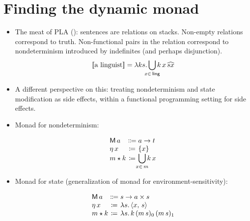\section{Finding the dynamic monad}
\begin{itemize}
	\item The meat of PLA (\citealt{Dekker:1994}): sentences are relations on stacks. Non-empty relations correspond to truth. Non-functional pairs in the relation correspond to nondeterminism introduced by indefinites (and perhaps disjunction).%
	\[\sv{\text{a linguist}} = \lambda ks.\bigcup_{\mathclap{x\in\,\textsf{ling}}}k\,x\,\widehat{sx}\]%

	\item A different perspective on this: treating nondeterminism and state modification as side effects, within a functional programming setting for side effects. %
	
	\item Monad for nondeterminism:
	\begin{defi}\label{set}
		\[\begin{array}[t]
			{@{}l@{}c@{}l@{}}
			\textsf{M}\,a &{}\Coloneqq{} &a \ra t%
			\\
			\eta\,x &{}\ceq{} &\{x\}
			\\
			m \star k &{}\ceq{} &\displaystyle\bigcup_{\mathclap{x\in \,m}}k\,x%
		\end{array}\]
	\end{defi}
	
	\item Monad for state (generalization of monad for environment-sensitivity):
	\begin{defi}\label{state}
		\[\begin{array}[t]
			{@{}l@{}c@{}l@{}}
			\textsf{M}\,a &{}\Coloneqq{} &s \ra a \times s%
			\\
			\eta\,x &{}\ceq{} &\lambda s .\,\ab{x,\,s}
			\\
			m \star k &{}\ceq{} &\lambda s.\,k\,(m\,s)_0\,(m\,s)_1%
		\end{array}\]
	\end{defi}
	

\end{itemize}
